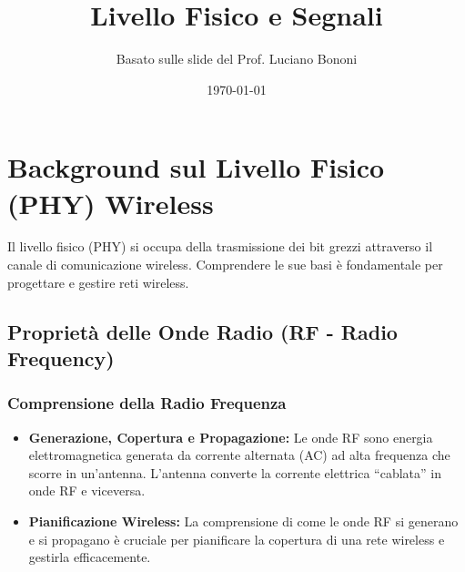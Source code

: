 


\title{Livello Fisico e Segnali}
\author{Basato sulle slide del Prof. Luciano Bononi}
\date{\today}



\maketitle
\tableofcontents
\newpage

\section{Background sul Livello Fisico (PHY) Wireless}
Il livello fisico (PHY) si occupa della trasmissione dei bit grezzi attraverso il canale di comunicazione wireless. Comprendere le sue basi è fondamentale per progettare e gestire reti wireless.

\subsection{Proprietà delle Onde Radio (RF - Radio Frequency)}

\subsubsection{Comprensione della Radio Frequenza}
\begin{itemize}
    \item \textbf{Generazione, Copertura e Propagazione:} Le onde RF sono energia elettromagnetica generata da corrente alternata (AC) ad alta frequenza che scorre in un'antenna. L'antenna converte la corrente elettrica ``cablata'' in onde RF e viceversa.
    \item \textbf{Pianificazione Wireless:} La comprensione di come le onde RF si generano e si propagano è cruciale per pianificare la copertura di una rete wireless e gestirla efficacemente.
\end{itemize}
\begin{center}
\end{center}

